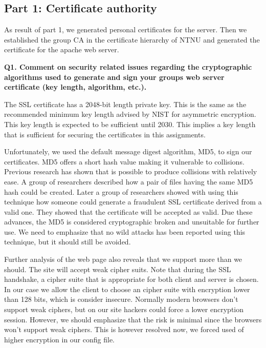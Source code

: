 
\subsection {Part 1: Certificate authority}

As result of part 1, we generated personal certificates for the server. Then we established the group CA in the certificate hierarchy of NTNU and generated the certificate for the apache web server. 
\newline

\noindent
{\bf Q1. Comment on security related issues regarding the cryptographic algorithms used to generate and sign your groups web server certificate (key length, algorithm, etc.).}
\newline

\noindent
The SSL certificate has a 2048-bit length private key. This is the same as the recommended minimum key length advised by NIST for asymmetric encryption. This key length is expected to be sufficient until 2030. \cite{nisc}This implies a key length that is sufficient for securing the certificates in this assignments. 
\newline

\noindent
Unfortunately, we used the default message digest algorithm, MD5, to sign our certificates. MD5 offers a short hash value making it vulnerable to collisions. Previous research has shown that is possible to produce collisions with relatively ease. A group of researchers described how a pair of files having the same MD5 hash could be created. Later a group of researchers showed with using this technique how someone could generate a fraudulent SSL certificate derived from a valid one. They showed that the certificate will be accepted as valid. Due these advances, the MD5 is considered cryptographic broken and unsuitable for further use. We need to emphasize that no wild attacks has been reported using this technique, but it should still be avoided. \cite {md5Wiki, md5Networking}
\newline

\noindent
Further analysis of the web page also reveals that we support more than we should. The site will accept weak cipher suits. Note that during the SSL handshake, a cipher suite that is appropriate for both client and server is chosen. In our case we allow the client to choose an cipher suite with encryption lower than 128 bits, which is consider insecure. Normally modern browsers don't support weak ciphers, but on our site hackers could force a lower encryption session. However, we should emphasize that the risk is minimal since the browsers won't support weak ciphers. \cite {cipher} This is however resolved now, we forced used of higher encryption in our config file. 
\newline

  





